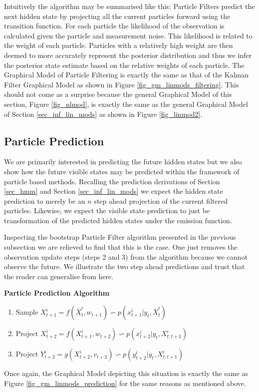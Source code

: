 Intuitively the algorithm may be summarised like this: Particle Filters predict the next hidden state by projecting all the current particles forward using the transition function. For each particle the likelihood of the observation is calculated given the particle and measurement noise. This likelihood is related to the weight of each particle. Particles with a relatively high weight are then deemed to more accurately represent the posterior distribution and thus we infer the posterior state estimate based on the relative weights of each particle. The Graphical Model of Particle Filtering is exactly the same as that of the Kalman Filter Graphical Model as shown in Figure \ref{fig_gm_linmods_filtering}. This should not come as a surprise because the general Graphical Model of this section, Figure \ref{fig_nlmod}, is exactly the same as the general Graphical Model of Section \ref{sec_inf_lin_mods} as shown in Figure \ref{fig_linmod2}. 

\subsection{Particle Prediction}
\label{sec_particle_prediction}
We are primarily interested in predicting the future hidden states but we also show how the future visible states may be predicted within the framework of particle based methods. Recalling the prediction derivations of Section \ref{sec_hmm} and Section \ref{sec_inf_lin_mods} we expect the hidden state prediction to merely be an $n$ step ahead projection of the current filtered particles. Likewise, we expect the visible state prediction to just be transformation of the predicted hidden states under the emission function. 

Inspecting the bootstrap Particle Filter algorithm presented in the previous subsection we are relieved to find that this is the case. One just removes the observation update steps (steps 2 and 3) from the algorithm because we cannot observe the future. We illustrate the two step ahead predictions and trust that the reader can generalise from here.

\textbf{Particle Prediction Algorithm}
\begin{enumerate}
\item
Sample $X_{t+1}^i = f(\bar{X}_t^i, w_{t+1}) \backsim p(x_{t+1}^i|y_t, \bar{X}_t^i)$ 
\item
Project $X_{t+2}^i = f(X_{t+1}^i, w_{t+2}) \backsim p(x_{t+2}^i|y_t, X_{t:t+1}^i)$ 
\item
Project $Y_{t+2}^i = g(X_{t+2}^i, v_{t+2}) \backsim p(y_{t+2}^i|y_t, X_{t:t+1}^i)$ 
\end{enumerate}
Once again, the Graphical Model depicting this situation is exactly the same as Figure \ref{fig_gm_linmods_prediction} for the same reasons as mentioned above.

